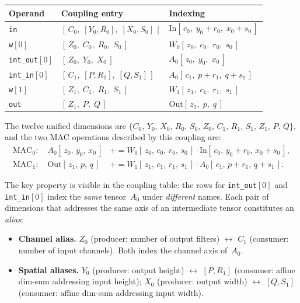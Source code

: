\begin{center}
\renewcommand{\arraystretch}{1.25}
\begin{tabular}{lll}
  \toprule
  \textbf{Operand}  & \textbf{Coupling entry} & \textbf{Indexing} \\
  \midrule
  \texttt{in}
      & $[\,C_0,\; [Y_0, R_0],\; [X_0, S_0]\,]$
      & $\text{In}[\,c_0,\; y_0\!+\!r_0,\; x_0\!+\!s_0\,]$ \\[3pt]
  \texttt{w}$[0]$
      & $[\,Z_0,\; C_0,\; R_0,\; S_0\,]$
      & $W_0[\,z_0,\; c_0,\; r_0,\; s_0\,]$ \\[3pt]
  \texttt{int\_out}$[0]$
      & $[\,Z_0,\; Y_0,\; X_0\,]$
      & $A_0[\,z_0,\; y_0,\; x_0\,]$ \\[3pt]
  \texttt{int\_in}$[0]$
      & $[\,C_1,\; [P, R_1],\; [Q, S_1]\,]$
      & $A_0[\,c_1,\; p\!+\!r_1,\; q\!+\!s_1\,]$ \\[3pt]
  \texttt{w}$[1]$
      & $[\,Z_1,\; C_1,\; R_1,\; S_1\,]$
      & $W_1[\,z_1,\; c_1,\; r_1,\; s_1\,]$ \\[3pt]
  \texttt{out}
      & $[\,Z_1,\; P,\; Q\,]$
      & $\text{Out}[\,z_1,\; p,\; q\,]$ \\
  \bottomrule
\end{tabular}
\end{center}

\noindent
The twelve unified dimensions are
$\{C_0,\, Y_0,\, X_0,\, R_0,\, S_0,\, Z_0,\, C_1,\, R_1,\, S_1,\,
Z_1,\, P,\, Q\}$, and the two MAC operations described by this
coupling are:
%
\begin{align}
  \text{MAC}_0: \quad A_0[\,z_0,\, y_0,\, x_0\,]
    &\mathrel{+}= W_0[\,z_0,\, c_0,\, r_0,\, s_0\,]
       \cdot \text{In}[\,c_0,\, y_0\!+\!r_0,\, x_0\!+\!s_0\,],
  \label{eq:mac0-alias} \\[4pt]
  \text{MAC}_1: \quad \text{Out}[\,z_1,\, p,\, q\,]
    &\mathrel{+}= W_1[\,z_1,\, c_1,\, r_1,\, s_1\,]
       \cdot A_0[\,c_1,\, p\!+\!r_1,\, q\!+\!s_1\,].
  \label{eq:mac1-alias}
\end{align}

\noindent
The key property is visible in the coupling table: the rows for
\texttt{int\_out}$[0]$ and \texttt{int\_in}$[0]$ index the
\emph{same} tensor~$A_0$ under \emph{different} names.
Each pair of dimensions that addresses the same axis of an
intermediate tensor constitutes an \emph{alias}:

\begin{itemize}
  \item \textbf{Channel alias.}
        $Z_0$ (producer: number of output filters) $\leftrightarrow$
        $C_1$ (consumer: number of input channels).
        Both index the channel axis of~$A_0$.

  \item \textbf{Spatial aliases.}
        $Y_0$ (producer: output height) $\leftrightarrow$
        $[P, R_1]$ (consumer: affine dim-sum addressing input height);
        $X_0$ (producer: output width) $\leftrightarrow$
        $[Q, S_1]$ (consumer: affine dim-sum addressing input width).
\end{itemize}

